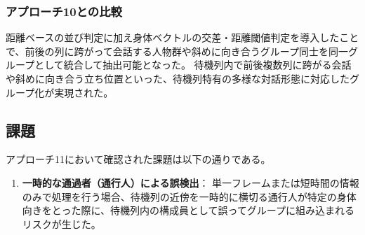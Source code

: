 \subsubsection{アプローチ10との比較}
距離ベースの並び判定に加え身体ベクトルの交差・距離閾値判定を導入したことで、前後の列に跨がって会話する人物群や斜めに向き合うグループ同士を同一グループとして統合して抽出可能となった。
待機列内で前後複数列に跨がる会話や斜めに向き合う立ち位置といった、待機列特有の多様な対話形態に対応したグループ化が実現された。

\subsection{課題}
アプローチ11において確認された課題は以下の通りである。

\begin{enumerate}
    \item \textbf{一時的な通過者（通行人）による誤検出}：
    単一フレームまたは短時間の情報のみで処理を行う場合、待機列の近傍を一時的に横切る通行人が特定の身体向きをとった際に、待機列内の構成員として誤ってグループに組み込まれるリスクが生じた。
\end{enumerate}

\clearpage

